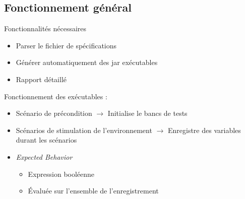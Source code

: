 \documentclass{beamer}
\begin{document}
\subsection{Fonctionnement g\'en\'eral}
\begin{frame}{Fonctionnalités nécessaires}
	\begin{itemize}
		\item Parser le fichier de spécifications
		\item Générer automatiquement des jar exécutables 
		\item Rapport détaillé
	\end{itemize}
	\pause

	Fonctionnement des exécutables : 
	\vspace{-10px}
	\begin{itemize}
		\item Scénario de précondition\newline
			\footnotesize
			$\rightarrow$ Initialise le bancs de tests
			\normalsize
			\pause
		\item Scénarios de stimulation de l'environnement\newline
			\footnotesize
			$\rightarrow$ Enregistre des variables durant les scénarios
			\normalsize
			\pause
		\item \textit{Expected Behavior }
			\footnotesize
			\begin{itemize}
				\item Expression booléenne
				\item Évaluée sur l'ensemble de l'enregistrement
			\end{itemize}
	\end{itemize}
\end{frame}
\end{document}
